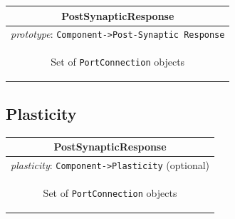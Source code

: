 \documentclass{article}
\begin{document}
\begin{table}[htb]
\center
\begin{tabular}{|c|}
\hline
\hline
PostSynapticResponse \\
\hline
\hline
{\em prototype}: {\tt Component->Post-Synaptic Response} \\
\hline
\colorbox{issuecolor}{\parbox{0.4\linewidth}
{\center Set of {\tt PortConnection} objects}} \\
\hline
\end{tabular}
\end{table}


\subsection{Plasticity}
\label{plasticity}

\begin{table}[htb]
\center
\begin{tabular}{|c|}
\hline
\hline
PostSynapticResponse \\
\hline
\hline
{\em plasticity}: {\tt Component->Plasticity} (optional) \\
\hline
\colorbox{issuecolor}{\parbox{0.4\linewidth}
{\center Set of {\tt PortConnection} objects}} \\
\hline
\end{tabular}
\end{table}
\end{document}
